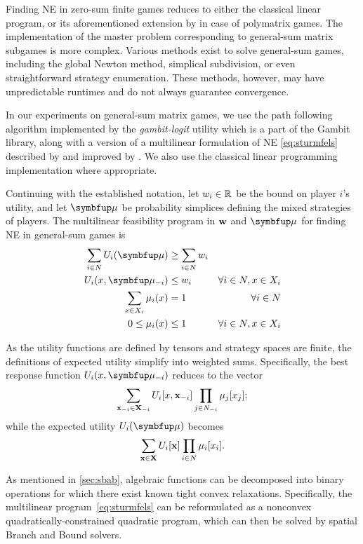 Finding NE in zero-sum finite games reduces to either the classical linear program, or its aforementioned extension by \textcite{Cai16} in case of polymatrix games. The implementation of the master problem corresponding to general-sum matrix subgames is more complex. Various methods exist to solve general-sum games, including the global Newton method, simplical subdivision, or even straightforward strategy enumeration. These methods, however, may have unpredictable runtimes and do not always guarantee convergence.

In our experiments on general-sum matrix games, we use the path following algorithm implemented by the \emph{gambit-logit} utility which is a part of the Gambit library, along with a version of a multilinear formulation of NE \eqref{eq:sturmfels} described by \textcite{sturmfels} and improved by \textcite{multilinear}. We also use the classical linear programming implementation where appropriate.

Continuing with the established notation, let $w_i \in \mathbb{R}$ be the bound on player $i$'s utility, and let $\bmu$ be probability simplices defining the mixed strategies of players. The multilinear feasibility program in $\mathbf{w}$ and $\bmu$ for finding NE in general-sum games is
\begin{equation}\label{eq:sturmfels}
	\begin{aligned}
		\sum_{i \in N} U_i(\bmu) &\ge \sum_{i \in N} w_i \\
		U_i(x, \bmu_{-i}) &\le w_i \quad &\forall i \in N, x \in X_i \\
		\sum_{x \in X_i} \mu_i(x) &= 1 \quad &\forall i \in N \\
		0 \le \mu_i(x) &\le 1 \quad &\forall i \in N, x \in X_i
	\end{aligned}
\end{equation}

As the utility functions are defined by tensors and strategy spaces are finite, the definitions of expected utility simplify into weighted sums. Specifically, the best response function $U_i(x, \bmu_{-i})$ reduces to the vector
\[
	\sum_{\mathbf{x}_{-i} \in \mathbf{X}_{-i}} U_i[x,\mathbf{x}_{-i}] \prod_{j \in N_{-i}} \mu_j[x_j];
\] while the expected utility $U_i(\bmu)$ becomes
\[
	\sum_{\mathbf{x} \in \mathbf{X}} U_i[\mathbf{x}] \prod_{i \in N} \mu_i[x_i].
\]

As mentioned in \cref{sec:sbab}, algebraic functions can be decomposed into binary operations for which there exist known tight convex relaxations. Specifically, the multilinear program~\ref{eq:sturmfels} can be reformulated as a nonconvex quadratically-constrained quadratic program, which can then be solved by spatial Branch and Bound solvers.

